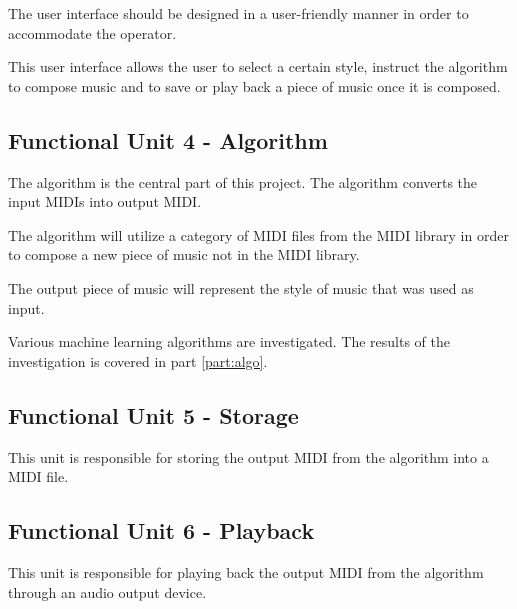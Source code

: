 The user interface should be designed in a user-friendly manner in order to accommodate the operator.

This user interface allows the user to select a certain style, instruct the algorithm to compose music and to save or play back a piece of music once it is composed.

\subsection{Functional Unit 4 - Algorithm}
The algorithm is the central part of this project. The algorithm converts the input \acp{MIDI} into output \ac{MIDI}.

The algorithm will utilize a category of \ac{MIDI} files from the \ac{MIDI} library in order to compose a new piece of music not in the \ac{MIDI} library.

The output piece of music will represent the style of music that was used as input.

Various machine learning algorithms are investigated. The results of the investigation is covered in part \ref{part:algo}.

\subsection{Functional Unit 5 - Storage}
This unit is responsible for storing the output \ac{MIDI} from the algorithm into a \ac{MIDI} file.

\subsection{Functional Unit 6 - Playback}
This unit is responsible for playing back the output \ac{MIDI} from the algorithm through an audio output device.

